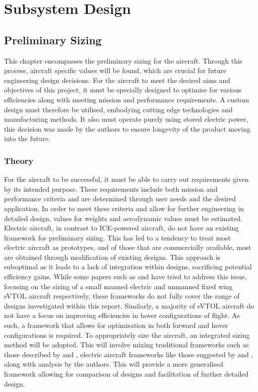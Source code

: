 \section{Subsystem Design}

\subsection{Preliminary Sizing}
This chapter encompasses the preliminary sizing for the aircraft. Through this process, aircraft specific values will be found, which are crucial for future engineering design decisions. For the aircraft to meet the desired aims and objectives of this project, it must be specially designed to optimise for various efficiencies along with meeting mission and performance requirements. A custom design must therefore be utilised, embodying cutting edge technologies and manufacturing methods. It also must operate purely using stored electric power, this decision was made by the authors to ensure longevity of the product moving into the future. 

\subsubsection{Theory}
For the aircraft to be successful, it must be able to carry out requirements given by its intended purpose. These requirements include both mission and performance criteria and are determined through user needs and the desired application. In order to meet these criteria and allow for further engineering in detailed design, values for weights and aerodynamic values must be estimated. Electric aircraft, in contrast to ICE-powered aircraft, do not have an existing framework for preliminary sizing. This has led to a tendency to treat most electric aircraft as prototypes, and of those that are commercially available, most are obtained through modification of existing designs. This approach is suboptimal as it leads to a lack of integration within designs, sacrificing potential efficiency gains. While some papers such as \cite{RN3} and \cite{RN85} have tried to address this issue, focusing on the sizing of a small manned electric and unmanned fixed wing eVTOL aircraft respectively, these frameworks do not fully cover the range of designs investigated within this report. Similarly, a majority of eVTOL aircraft do not have a focus on improving efficiencies in hover configurations of flight. As such, a framework that allows for optimisation in both forward and hover configurations is required. To appropriately size the aircraft, an integrated sizing method will be adopted. This will involve mixing traditional frameworks such as those described by \cite{roskam1985airplane} and \cite{raymer1989aircraft}, electric aircraft frameworks like those suggested by \cite{RN3} and \cite{RN85}, along with analysis by the authors. This will provide a more generalised framework allowing for comparison of designs and facilitation of further detailed design.

